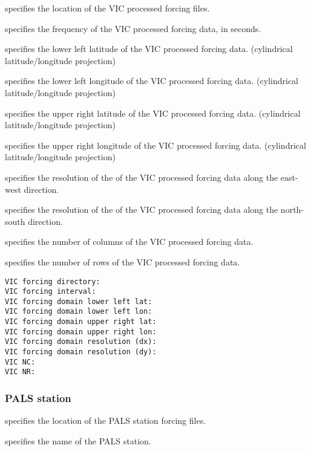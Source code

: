  
  specifies the location of the VIC
 processed forcing files.

  specifies the frequency of the VIC
 processed forcing data, in seconds.

  specifies the lower left
 latitude of the VIC processed forcing data.
 (cylindrical latitude/longitude projection)

  specifies the lower left
 longitude of the VIC processed forcing data.
 (cylindrical latitude/longitude projection)

  specifies the upper
 right latitude of the VIC processed forcing data.
 (cylindrical latitude/longitude projection)

  specifies the upper
 right longitude of the VIC processed forcing data.
 (cylindrical latitude/longitude projection)

  specifies the resolution
 of the of the VIC processed forcing data along the east-west direction.

  specifies the resolution
 of the of the VIC processed forcing data along the north-south
 direction.

  specifies the number of columns of the VIC
 processed forcing data.

  specifies the number of rows of the VIC processed
 forcing data.
 

 \begin{Verbatim}[frame=single]
VIC forcing directory:
VIC forcing interval:
VIC forcing domain lower left lat:
VIC forcing domain lower left lon:
VIC forcing domain upper right lat:
VIC forcing domain upper right lon:
VIC forcing domain resolution (dx):
VIC forcing domain resolution (dy):
VIC NC:
VIC NR:
 \end{Verbatim}

 
 \subsubsection{PALS station} \label{sssec:pals}
 

 
  specifies the location of the
 PALS station forcing files.

  specifies the name of the
 PALS station.

